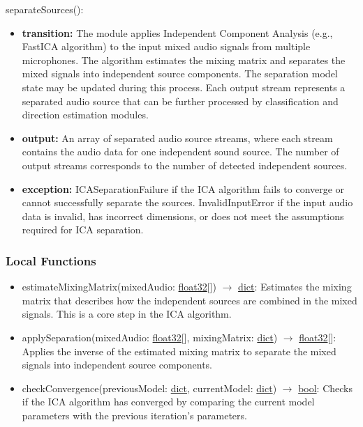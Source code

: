 \documentclass[12pt, titlepage]{article}
\begin{document}
\noindent separateSources():
\begin{itemize}
\item \textbf{transition:} The module applies Independent Component Analysis
  (e.g., FastICA algorithm) to the input mixed audio signals from multiple
  microphones. The algorithm estimates the mixing matrix and separates the mixed
  signals into independent source components. The separation model state may be
  updated during this process. Each output stream represents a separated audio
  source that can be further processed by classification and direction
  estimation modules.

\item \textbf{output:} An array of separated audio source streams, where each
  stream contains the audio data for one independent sound source. The number of
  output streams corresponds to the number of detected independent sources.

\item \textbf{exception:} ICASeparationFailure if the ICA algorithm fails to
  converge or cannot successfully separate the sources. InvalidInputError if the
  input audio data is invalid, has incorrect dimensions, or does not meet the
  assumptions required for ICA separation.
\end{itemize}

\subsubsection{Local Functions}

\begin{itemize}
  \item estimateMixingMatrix(mixedAudio:
    \hyperref[generic:float32]{float32}[]) $\rightarrow$
    \hyperref[ds:dict]{dict}: Estimates the mixing matrix that describes how the
    independent sources are combined in the mixed signals. This is a core step
    in the ICA algorithm.
  \item applySeparation(mixedAudio: \hyperref[generic:float32]{float32}[],
    mixingMatrix: \hyperref[ds:dict]{dict}) $\rightarrow$
    \hyperref[generic:float32]{float32}[]: Applies the inverse of the
    estimated mixing matrix to separate the mixed signals into independent
    source components.
  \item checkConvergence(previousModel: \hyperref[ds:dict]{dict}, currentModel:
    \hyperref[ds:dict]{dict}) $\rightarrow$ \hyperref[generic:bool]{bool}:
    Checks if the ICA algorithm has converged by comparing the current model
    parameters with the previous iteration's parameters.
\end{itemize}
\end{document}
